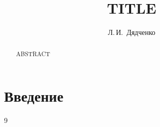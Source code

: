 \documentclass[12pt,a4paper]{article}
\title{TITLE}
\author{Л.\,И.~Дядченко}
\date{}
\theoremstyle{definition}
\begin{document}
\maketitle
\begin{abstract}
ABSTRACT
\end{abstract}

\section{Введение}

\begin{thebibliography}{9}
\end{thebibliography}
\end{document}
